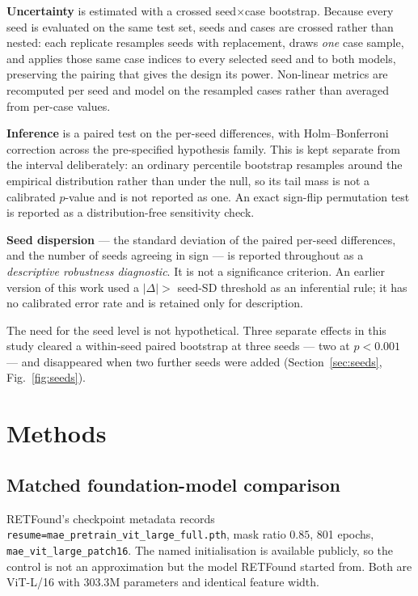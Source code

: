 \documentclass[journal]{IEEEtran}
\begin{document}
\textbf{Uncertainty} is estimated with a crossed seed$\times$case
bootstrap. Because every seed is evaluated on the same test set, seeds and
cases are crossed rather than nested: each replicate resamples seeds with
replacement, draws \emph{one} case sample, and applies those same case indices
to every selected seed and to both models, preserving the pairing that gives
the design its power. Non-linear metrics are recomputed per seed and model on
the resampled cases rather than averaged from per-case values.

\textbf{Inference} is a paired test on the per-seed differences, with
Holm--Bonferroni correction across the pre-specified hypothesis family. This
is kept separate from the interval deliberately: an ordinary percentile
bootstrap resamples around the empirical distribution rather than under the
null, so its tail mass is not a calibrated $p$-value and is not reported as
one. An exact sign-flip permutation test is reported as a distribution-free
sensitivity check.

\textbf{Seed dispersion} --- the standard deviation of the paired per-seed
differences, and the number of seeds agreeing in sign --- is reported
throughout as a \emph{descriptive robustness diagnostic}. It is not a
significance criterion. An earlier version of this work used a
$|\Delta| >$ seed-SD threshold as an inferential rule; it has no
calibrated error rate and is retained only for description.

The need for the seed level is not hypothetical. Three separate effects in
this study cleared a within-seed paired bootstrap at three seeds --- two at
$p<0.001$ --- and disappeared when two further seeds were added
(Section~\ref{sec:seeds}, Fig.~\ref{fig:seeds}).

\section{Methods}

\subsection{Matched foundation-model comparison}
RETFound's checkpoint metadata records
\texttt{resume=mae\_pretrain\_vit\_large\_full.pth}, mask ratio $0.85$, 801
epochs, \texttt{mae\_vit\_large\_patch16}. The named initialisation is
available publicly, so the control is not an approximation but the model
RETFound started from. Both are ViT-L/16 with $303.3$M parameters and identical
feature width.
\end{document}
